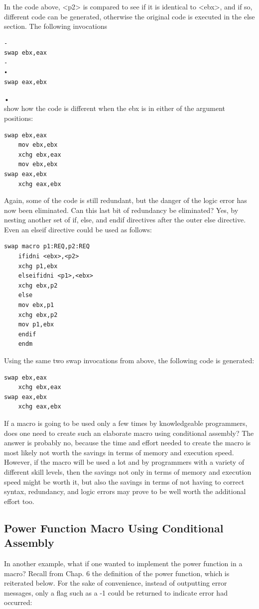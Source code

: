 \documentclass[10pt]{article}
\begin{document}
In the code above, <p2> is compared to see if it is identical to <ebx>, and if so, different code can be generated, otherwise the original code is executed in the else section. The following invocations

\begin{verbatim}
-
swap ebx,eax
-
•
swap eax,ebx
\end{verbatim}

•\\
show how the code is different when the ebx is in either of the argument positions:

\begin{verbatim}
swap ebx,eax
    mov ebx,ebx
    xchg ebx,eax
    mov ebx,ebx
swap eax,ebx
    xchg eax,ebx
\end{verbatim}

Again, some of the code is still redundant, but the danger of the logic error has now been eliminated. Can this last bit of redundancy be eliminated? Yes, by nesting another set of if, else, and endif directives after the outer else directive. Even an elseif directive could be used as follows:

\begin{verbatim}
swap macro p1:REQ,p2:REQ
    ifidni <ebx>,<p2>
    xchg p1,ebx
    elseifidni <p1>,<ebx>
    xchg ebx,p2
    else
    mov ebx,p1
    xchg ebx,p2
    mov p1,ebx
    endif
    endm
\end{verbatim}

Using the same two swap invocations from above, the following code is generated:

\begin{verbatim}
swap ebx,eax
    xchg ebx,eax
swap eax,ebx
    xchg eax,ebx
\end{verbatim}

If a macro is going to be used only a few times by knowledgeable programmers, does one need to create such an elaborate macro using conditional assembly? The answer is probably no, because the time and effort needed to create the macro is most likely not worth the savings in terms of memory and execution speed. However, if the macro will be used a lot and by programmers with a variety of different skill levels, then the savings not only in terms of memory and execution speed might be worth it, but also the savings in terms of not having to correct syntax, redundancy, and logic errors may prove to be well worth the additional effort too.

\subsection*{Power Function Macro Using Conditional Assembly}
In another example, what if one wanted to implement the power function in a macro? Recall from Chap. 6 the definition of the power function, which is reiterated below. For the sake of convenience, instead of outputting error messages, only a flag such as a -1 could be returned to indicate error had occurred:
\end{document}
